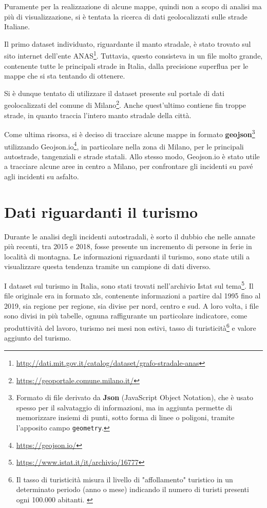 \documentclass[a4paper,12pt]{report}
\newcommand{\columnstyle}[1]{\texttt{#1}}
\begin{document}
Puramente per la realizzazione di alcune mappe, quindi non a scopo di analisi 
ma più di visualizzazione, si è tentata la ricerca di dati geolocalizzati sulle 
strade Italiane.

Il primo dataset individuato, riguardante il manto  stradale, è stato trovato sul sito 
internet dell'ente  
ANAS\footnote{\url{http://dati.mit.gov.it/catalog/dataset/grafo-stradale-anas}}. 
Tuttavia, questo consisteva in un file molto grande, contenente tutte le principali 
strade in Italia, dalla precisione superflua per le mappe che si sta tentando di ottenere.

Si è dunque tentato di utilizzare il dataset presente sul portale di dati geolocalizzati 
del comune di Milano\footnote{\url{https://geoportale.comune.milano.it/}}. 
Anche quest'ultimo contiene fin troppe strade, in quanto traccia l'intero manto 
stradale della città.

Come ultima risorsa, si è deciso di tracciare alcune mappe in formato 
\textbf{geojson}\footnote{Formato di file derivato da \textbf{Json} 
(JavaScript Object Notation), che è usato spesso per il salvataggio di informazioni, ma 
in aggiunta permette di memorizzare insiemi di punti, sotto forma di linee o poligoni, 
tramite l'apposito campo \columnstyle{geometry}.} utilizzando 
Geojson.io\footnote{\url{https://geojson.io/}}, in particolare nella zona di Milano, 
per le principali autostrade, tangenziali e strade statali. 
Allo stesso modo, Geojson.io è stato utile a tracciare alcune aree in centro a Milano, 
per confrontare gli incidenti su pavé agli incidenti su asfalto.

\section{Dati riguardanti il turismo}

Durante le analisi degli incidenti autostradali, è sorto il dubbio che 
nelle annate più recenti, tra 2015 e 2018, 
fosse presente un incremento di persone in ferie in località di montagna. 
Le informazioni riguardanti il turismo, sono state utili a visualizzare questa tendenza 
tramite un campione di dati diverso.

I dataset sul turismo in Italia, sono stati trovati nell'archivio Istat sul 
tema\footnote{\url{https://www.istat.it/it/archivio/16777}}.
Il file originale era in formato xls, contenente informazioni a partire dal 1995 
fino al 2019, sia regione per regione, sia divise per nord, centro e sud.
A loro volta, i file sono divisi in più tabelle, ognuna raffigurante un particolare 
indicatore, come produttività del lavoro, turismo nei mesi non estivi, 
tasso di turisticità\footnote{Il tasso di turisticità misura il livello di "affollamento" 
turistico in un determinato periodo (anno o mese) indicando il numero di turisti presenti 
ogni 100.000 abitanti. \cite{ONTIT:1}} 
e valore aggiunto del turismo.
\end{document}
